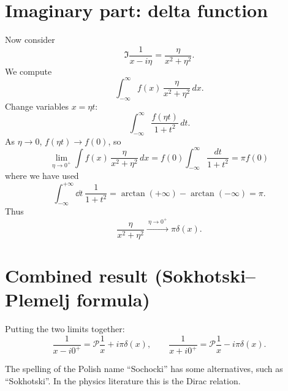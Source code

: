 \documentclass{article}
\theoremstyle{definition}
\theoremstyle{plain}
\numberwithin{equation}{section}
\begin{document}
\section{Imaginary part: delta function}

Now consider
\begin{equation}
\Im \frac{1}{x-i\eta} = \frac{\eta}{x^2+\eta^2}.
\end{equation}
We compute
\begin{equation}
\int_{-\infty}^{\infty} f(x)\,\frac{\eta}{x^2+\eta^2}\,dx.
\end{equation}
Change variables $x = \eta t$:
\begin{equation}
\int_{-\infty}^{\infty} \frac{f(\eta t)}{1+t^2}\,dt.
\end{equation}
As $\eta \to 0$, $f(\eta t)\to f(0)$, so
\begin{equation}
\lim_{\eta\to0^+}\int f(x)\,\frac{\eta}{x^2+\eta^2}\,dx = f(0)\int_{-\infty}^{\infty}\frac{dt}{1+t^2} = \pi f(0)
\end{equation}
where we have used
\[
    \int _{-\infty} ^{+\infty} \dd t\ 
    \frac{1}{1+t^{2}} 
    =
    \arctan(+\infty) - \arctan(-\infty)
    = \pi.
\]
Thus
\begin{equation}
\frac{\eta}{x^2+\eta^2} \xrightarrow{\ \eta \to 0^+\ } \pi \delta(x).
\end{equation}

\section{Combined result (Sokhotski--Plemelj formula)}

Putting the two limits together:
\begin{equation}
\frac{1}{x-i0^+} = \mathcal{P}\frac{1}{x} + i\pi \delta(x), \qquad
\frac{1}{x+i0^+} = \mathcal{P}\frac{1}{x} - i\pi \delta(x).
\end{equation}

The spelling of the Polish name ``Sochocki'' has some alternatives, 
such as ``Sokhotski''. In the physics literature this is the Dirac relation. 

\printbibliography
\end{document}
